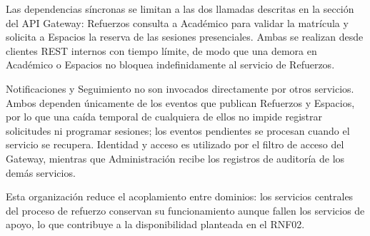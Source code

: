 Las dependencias síncronas se limitan a las dos llamadas descritas
en la sección del API Gateway: Refuerzos consulta a Académico para
validar la matrícula y solicita a Espacios la reserva de las
sesiones presenciales. Ambas se realizan desde clientes REST
internos con tiempo límite, de modo que una demora en Académico o
Espacios no bloquea indefinidamente al servicio de Refuerzos.

Notificaciones y Seguimiento no son invocados directamente por
otros servicios. Ambos dependen únicamente de los eventos que
publican Refuerzos y Espacios, por lo que una caída temporal de
cualquiera de ellos no impide registrar solicitudes ni programar
sesiones; los eventos pendientes se procesan cuando el servicio
se recupera. Identidad y acceso es utilizado por el filtro de acceso
del Gateway, mientras que Administración recibe los registros de
auditoría de los demás servicios.

Esta organización reduce el acoplamiento entre dominios: los
servicios centrales del proceso de refuerzo conservan su
funcionamiento aunque fallen los servicios de apoyo, lo que
contribuye a la disponibilidad planteada en el RNF02.
